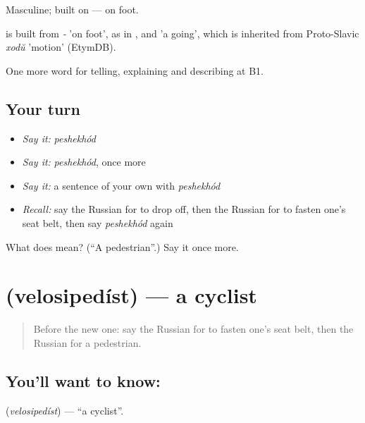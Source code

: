 Masculine; built on \emph{} — on foot.

\begin{cousinweb}
\emph{} is built from \emph{-} 'on foot', as in \emph{}, and \emph{} 'a going', which is inherited from Proto-Slavic \emph{xodŭ} 'motion' (EtymDB).
\end{cousinweb}

\begin{grammarlens}[title={What you've built}]
One more word for telling, explaining and describing at B1.
\end{grammarlens}

\subsection*{Your turn}
\begin{itemize}
\raggedright
  \item \emph{Say it:} \emph{peshekhód}
  \item \emph{Say it:} \emph{peshekhód}, once more
  \item \emph{Say it:} a sentence of your own with \emph{peshekhód}
  \item \emph{Recall:} say the Russian for to drop off, then the Russian for to fasten one's seat belt, then say \emph{peshekhód} again
\end{itemize}

\begin{tcolorbox}[breakable,colback=teal!4,colframe=teal!35!black,title={Before you move on}]
What does  mean? (\textquotedblleft{}A pedestrian\textquotedblright{}.) Say it once more.
\end{tcolorbox}
\section[\texorpdfstring{\ru{велосипедист} (velosipedíst)}{велосипедист (velosipedíst)}]{ (velosipedíst) — a cyclist}

\label{lesson:RU-C412-velosipedist}



\begin{quote}
Before the new one: say the Russian for to fasten one's seat belt, then the Russian for a pedestrian.
\end{quote}

\subsection*{You'll want to know: }
\textbf{} (\emph{velosipedíst}) — \textquotedblleft{}a cyclist\textquotedblright{}.

